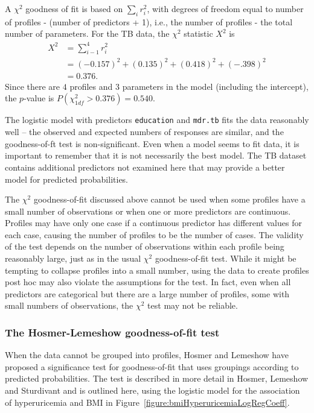  A $\chi^2$ goodness of fit is based on $\sum_i r_i^2$, with degrees of freedom equal to number of profiles - (number of predictors + 1), i.e., the number of profiles - the total number of parameters.  For the TB data, the $\chi^2$ statistic $X^2$ is
\begin{align*}
   X^2 &= \sum_{i - 1}^4 r_i^2 \\
       &= (-0.157)^2 + (0.135)^2 + (0.418)^2 + (-.398)^2 \\
       &= 0.376.
\end{align*}
Since there are $4$ profiles and $3$ parameters in the model (including the intercept), the $p$-value is $P(\chi^2_{1df} > 0.376) = 0.540$.

The logistic model with predictors \texttt{education} and \texttt{mdr.tb}  fits the data reasonably well -- the observed and expected numbers of responses are similar, and the goodness-of-ft test is non-significant.  Even when a model seems to fit data, it is important to remember that it is not necessarily the best model. The TB dataset contains additional predictors not examined here that may provide a better model for predicted probabilities.

The $\chi^2$ goodness-of-fit discussed above cannot be used when some profiles have a small number of observations or when one or more predictors are continuous.  Profiles may have only one case if a continuous predictor has different values for each case, causing the number of profiles to be the number of cases.  The validity of the test depends on the number of observations within each profile being reasonably large, just as in the usual $\chi^2$ goodness-of-fit test.  While it might be tempting to collapse profiles into a small number, using the data to create profiles post hoc may also violate the assumptions for the test.  In fact, even when all predictors are categorical but there are a large number of profiles, some with small numbers of observations, the $\chi^2$ test may not be reliable.

\subsubsection{The Hosmer-Lemeshow goodness-of-fit test}

 When the data cannot be grouped into profiles, Hosmer and Lemeshow have proposed a significance test for goodness-of-fit that uses groupings according to predicted probabilities.   The test is described in more detail in Hosmer, Lemeshow and Sturdivant and is outlined here, using the logistic model for the association of hyperuricemia and BMI in Figure~\ref{figure:bmiHyperuricemiaLogRegCoeff}.

